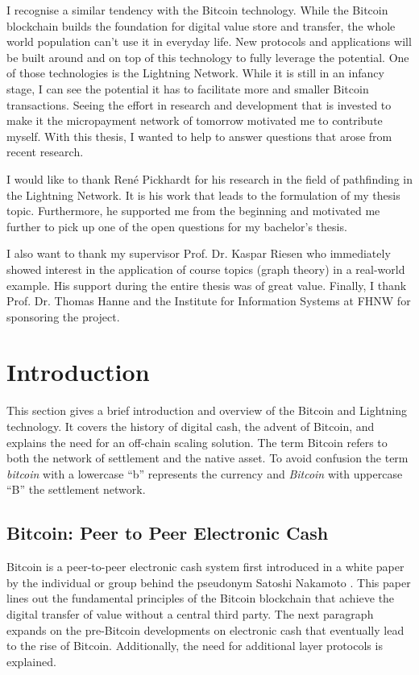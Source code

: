 \documentclass[final]{fhnwreport}       %
\begin{document}
I recognise a similar tendency with the Bitcoin technology. While the Bitcoin blockchain builds the foundation for digital value store and transfer, the whole world population can't use it in everyday life. New protocols and applications will be built around and on top of this technology to fully leverage the potential. One of those technologies is the Lightning Network. While it is still in an    infancy stage, I can see the potential it has to facilitate more and smaller Bitcoin transactions. Seeing the effort in research and development that is invested to make it the micropayment network of tomorrow motivated me to contribute myself. With this thesis, I wanted to help to answer questions that arose from recent research.

I would like to thank René Pickhardt for his research in the field of pathfinding in the Lightning Network. It is his work that leads to the formulation of my thesis topic. Furthermore, he supported me from the beginning and motivated me further to pick up one of the open questions for my bachelor's thesis.

I also want to thank my supervisor Prof. Dr. Kaspar Riesen who immediately showed interest in the application of course topics (graph theory) in a real-world example. His support during the entire thesis was of great value. Finally, I thank Prof. Dr. Thomas Hanne and the Institute for Information Systems at FHNW for sponsoring the project.

\clearpage
{}
\section{Introduction} 
This section gives a brief introduction and overview of the Bitcoin and Lightning technology. It covers the history of digital cash, the advent of Bitcoin, and explains the need for an off-chain scaling solution. The term Bitcoin refers to both the network of settlement and the native asset. To avoid confusion the term \emph{bitcoin} with a lowercase ``b'' represents the currency and \emph{Bitcoin} with uppercase ``B'' the settlement network.

\subsection{Bitcoin: Peer to Peer Electronic Cash}\label{subsec:peertopeer}
Bitcoin is a peer-to-peer electronic cash system first introduced in a white paper by the individual or group behind the pseudonym Satoshi Nakamoto \citep{nakamoto_bitcoin_2008}. This paper lines out the fundamental principles of the Bitcoin \gls{blockchain} that achieve the digital transfer of value without a central third party. The next paragraph expands on the pre-Bitcoin developments on electronic cash that eventually lead to the rise of Bitcoin. Additionally, the need for additional layer protocols is explained.
\end{document}
